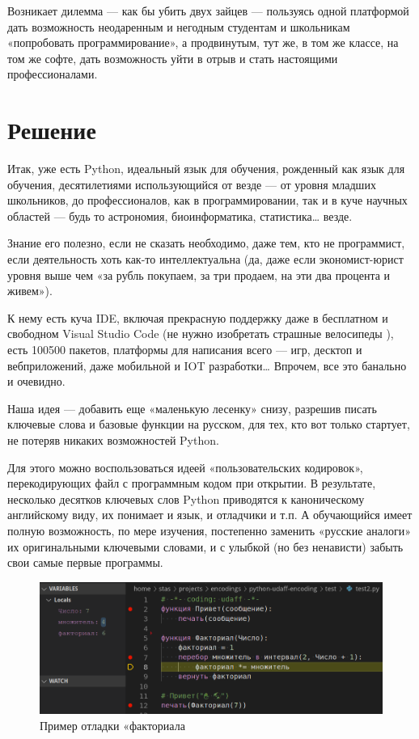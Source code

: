 ﻿\documentclass[a4paper,12pt]{article}
\begin{document}
Возникает дилемма --- как бы убить двух зайцев --- пользуясь одной
платформой дать возможность неодаренным и негодным
студентам и школьникам \cite{students-sucks} «попробовать программирование», а продвинутым,
тут же, в том же классе, на том же софте, дать возможность уйти в отрыв
и стать настоящими профессионалами.

\section{Решение}

Итак, уже есть Python, идеальный язык для обучения, рожденный как язык
для обучения, десятилетиями использующийся от везде --- от уровня
младших школьников, до профессионалов, как в программировании, так и в
куче научных областей --- будь то астрономия, биоинформатика,
статистика\ldots{} везде.

Знание его полезно, если не сказать необходимо, даже тем, кто не
программист, если деятельность хоть как-то интеллектуальна (да, даже
если экономист-юрист уровня выше чем «за рубль покупаем, за три продаем,
на эти два процента и живем»).

К нему есть куча IDE, включая прекрасную поддержку даже в бесплатном и
свободном Visual Studio Code (не нужно
изобретать страшные велосипеды \cite{ide-python}), есть
100500 пакетов, платформы для написания всего --- игр, десктоп и
вебприложений, даже мобильной и IOT разработки\ldots{} Впрочем, все это
банально и очевидно.
 
Наша идея --- добавить еще «маленькую лесенку» снизу, разрешив писать
ключевые слова и базовые функции на русском, для тех, кто вот только
стартует, не потеряв никаких возможностей Python.

Для этого можно воспользоваться идеей «пользовательских кодировок»,
перекодирующих файл с программным кодом при открытии. В результате,
несколько десятков ключевых слов Python приводятся к каноническому
английскому виду, их понимает и язык, и отладчики и т.п. А обучающийся
имеет полную возможность, по мере изучения, постепенно заменить «русские
аналоги» их оригинальными ключевыми словами, и с улыбкой (но без
ненависти) забыть свои самые первые программы.

\begin{figure}
\centering
\includegraphics[width=\textwidth]{pictures/factorial.png}
\caption{Пример отладки «факториала}
\end{figure}
\end{document}
